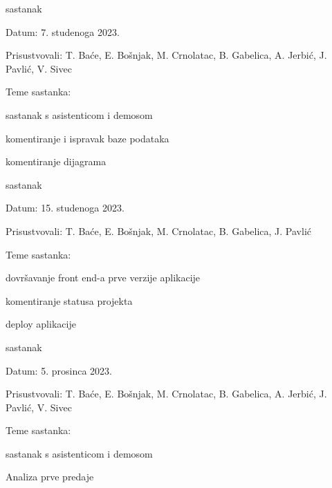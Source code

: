 \begin{packed_enum}
			\item  sastanak
			\item[] \begin{packed_item}
				\item Datum: 7. studenoga 2023.
				\item Prisustvovali: T. Baće, E. Bošnjak, M. Crnolatac, B. Gabelica, A. Jerbić, J. Pavlić, V. Sivec
				\item Teme sastanka:
				\begin{packed_item}
					\item  sastanak s asistenticom i demosom
					\item  komentiranje i ispravak baze podataka
					\item  komentiranje dijagrama
				\end{packed_item}
			\end{packed_item}
			
			\item  sastanak
			\item[] \begin{packed_item}
				\item Datum: 15. studenoga 2023.
				\item Prisustvovali: T. Baće, E. Bošnjak, M. Crnolatac, B. Gabelica, J. Pavlić
				\item Teme sastanka:
				\begin{packed_item}
					\item  dovršavanje front end-a prve verzije aplikacije
					\item  komentiranje statusa projekta
					\item  deploy aplikacije
				\end{packed_item}
			\end{packed_item}
			
			\item  sastanak
			\item[] \begin{packed_item}
				\item Datum: 5. prosinca 2023.
				\item Prisustvovali: T. Baće, E. Bošnjak, M. Crnolatac, B. Gabelica, A. Jerbić, J. Pavlić, V. Sivec
				\item Teme sastanka:
				\begin{packed_item}
					\item  sastanak s asistenticom i demosom
					\item  Analiza prve predaje
				\end{packed_item}
			\end{packed_item}
			

\end{packed_enum}
